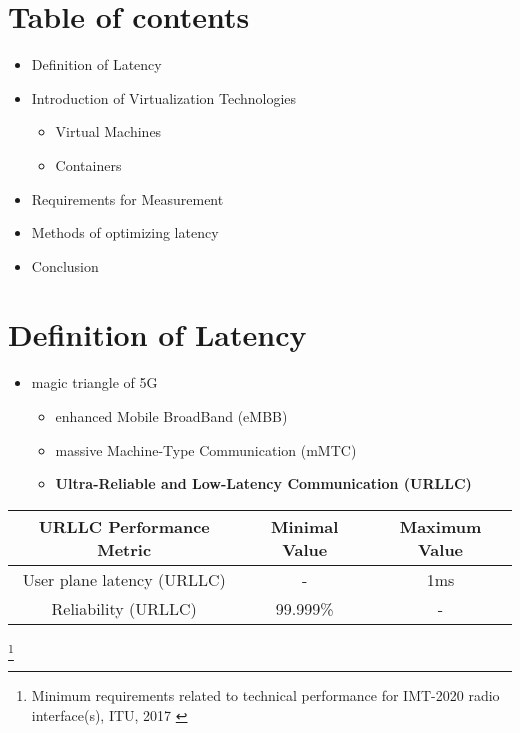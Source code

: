 \section{Table of contents}
\begin{frame}
    \begin{itemize}
        \item<1> Definition of Latency
        \item<1> Introduction of Virtualization Technologies
            \begin{itemize}
                \item<1> Virtual Machines
                \item<1> Containers
            \end{itemize}
        \item<1> Requirements for Measurement
        \item<1> Methods of optimizing latency
        \item<1> Conclusion
    \end{itemize}
\end{frame}

\section{Definition of Latency}
\begin{frame}
    \centering
    \begin{itemize}
        \item magic triangle of 5G
              \begin{itemize}
                  \item enhanced Mobile BroadBand (eMBB)
                  \item massive Machine-Type Communication (mMTC)
                  \item \textbf{Ultra-Reliable and Low-Latency Communication (URLLC)}
              \end{itemize}
    \end{itemize}




    \begin{tabular}{|c|c|c|}
        \hline
        \textbf{URLLC Performance Metric} & \textbf{Minimal Value} & \textbf{Maximum Value} \\ \hline
        User plane latency (URLLC)        & -                      & 1ms                    \\ \hline
        Reliability (URLLC)               & 99.999\%               & -                      \\ \hline
    \end{tabular}

    \footnote{Minimum requirements related to technical performance
        for IMT-2020 radio interface(s), ITU, 2017 \cite{b1}}

\end{frame}




